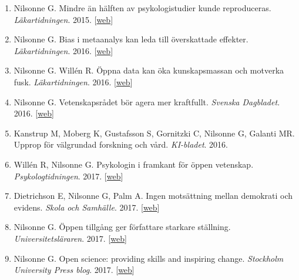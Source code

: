 \documentclass[10pt,a4paper,twocolumn]{article}
\begin{document}
\begin{enumerate}
    \item Nilsonne G. Mindre än hälften av psykologistudier kunde reproduceras. \textit{Läkartidningen}. 2015. [\href{http://www.lakartidningen.se/Klinik-och-vetenskap/Nya-ron/2015/09/Mindre-an-halften-av-psykologistudier-kunde-upprepas/}{web}]

    \item Nilsonne G. Bias i metaanalys kan leda till överskattade effekter. \textit{Läkartidningen}. 2016. [\href{http://lakartidningen.se/Klinik-och-vetenskap/Nya-ron/2015/11/Samband-mellan-inflammation-och-PTSD-granskad-i-metaanalys/}{web}]

    \item Nilsonne G. Willén R. Öppna data kan öka kunskapsmassan och motverka fusk. \textit{Läkartidningen}. 2016. [\href{http://www.lakartidningen.se/Klinik-och-vetenskap/Kommentar/2016/10/Oppna-data-kan-oka-kunskapsmassan-och-motverka-fusk/}{web}]

    \item Nilsonne G. Vetenskapsrådet bör agera mer kraftfullt. \textit{Svenska Dagbladet}. 2016. [\href{http://www.svd.se/vetenskapsradet-bor-agera-mer-kraftfullt/om/debatt}{web}]

    \item Kanstrup M, Moberg K, Gustafsson S, Gornitzki C, Nilsonne G, Galanti MR. Upprop för välgrundad forskning och vård. \textit{KI-bladet}. 2016.

    \item Willén R, Nilsonne G. Psykologin i framkant för öppen vetenskap. \textit{Psykologtidningen}. 2017. [\href{http://www.diva-portal.org/smash/record.jsf?pid=diva2%3A1172689}{web}]

    \item Dietrichson E, Nilsonne G, Palm A. Ingen motsättning mellan demokrati och evidens. \textit{Skola och Samhälle}. 2017. [\href{http://www.skolaochsamhalle.se/flode/skola/elias-dietrichson-med-flera-ingen-motsattning-mellan-demokrati-och-evidens/}{web}]

    \item Nilsonne G. Öppen tillgång ger författare starkare ställning. \textit{Universitetsläraren}. 2017. [\href{https://universitetslararen.se/2017/06/01/oppen-tillgang-ger-forfattare-starkare-stallning/}{web}]

    \item Nilsonne G. Open science: providing skills and inspiring change. \textit{Stockholm University Press blog}. 2017. [\href{https://blog.stockholmuniversitypress.se/2017/06/26/open-science-providing-skills-and-inspiring-change/}{web}]


\end{enumerate}
\end{document}
